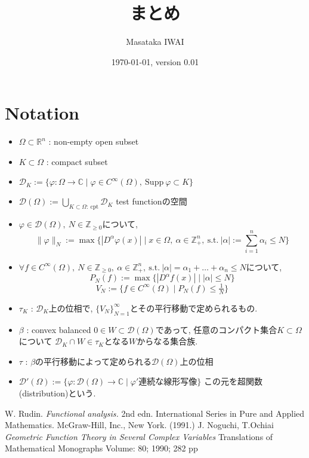 \documentclass[dvipdfmx,a4paper,11pt]{article} %
\title{まとめ}
\author{Masataka IWAI}
\date{\today, version 0.01}
\theoremstyle{definition}
\theoremstyle{remark}
\numberwithin{equation}{section}
\newcommand{\N}{\mathbb{Z}_+}
\begin{document}


\section*{Notation}
\begin{itemize}
    \item \(\Omega \subset \mathbb{R}^n\) : non-empty open subset
    \item \(K \subset \Omega\) : compact subset %
    \item \(\mathcal{D}_K := \{\varphi : \Omega \to \mathbb{C} \mid \varphi \in C^\infty(\Omega), \ \mathrm{Supp} \ \varphi \subset K\}\)
    \item \(\mathcal{D}(\Omega) := \bigcup_{K \subset \Omega: \ \mathrm{cpt}} \mathcal{D}_K\) test functionの空間
    \item \(\varphi \in \mathcal{D}(\Omega), \ N \in \mathbb{Z}_{\ge 0}\)について, 
    \[
    \|\varphi\|_N := \max \{ |D^\alpha \varphi(x)| \mid x \in \Omega, \ \alpha \in \N^n, \ \text{s.t.} \ |\alpha| := \sum_{i=1}^n \alpha_i \le N \}
    \]
    \item \(\forall f \in C^\infty(\Omega), \ N \in \mathbb{Z}_{\ge 0}, \ \alpha \in \N^n, \ \text{s.t.} \ |\alpha| = \alpha_1 + \dots + \alpha_n \le N\)について, 
    \[
    P_N(f) := \max \{ |D^\alpha f(x)| \mid |\alpha| \le N \}
    \]
    \[
    V_N := \{ f \in C^\infty(\Omega) \mid P_N(f) \le \tfrac{1}{N} \}
    \]
    \item \(\tau_K\) : \(\mathcal{D}_K\)上の位相で, \(\{V_N\}_{N=1}^\infty\)とその平行移動で定められるもの. 
    \item \(\beta\) : convex  balanced \(0 \in W \subset \mathcal{D}(\Omega)\)であって, 任意のコンパクト集合$K \subset \Omega$について
    \(\mathcal{D}_K \cap W \in \tau_K\)となる$W$からなる集合族. 
        \item \(\tau\) : \(\beta\)の平行移動によって定められる\(\mathcal{D}(\Omega)\)上の位相
    \item \(\mathcal{D}'(\Omega) := \{ \varphi : \mathcal{D}(\Omega) \to \mathbb{C} \mid \varphi' \text{連続な線形写像} \}\) この元を超関数(distribution)という. 
\end{itemize}

\begin{thebibliography}{n}
W. Rudin. \textit{Functional analysis.} 2nd edn. International Series in Pure and Applied Mathematics. McGraw-Hill, Inc., New York. (1991.)
J. Noguchi, T.Ochiai \textit{Geometric Function Theory in Several Complex Variables} Translations of Mathematical Monographs
Volume: 80; 1990; 282 pp
\end{thebibliography}
 
\end{document}
